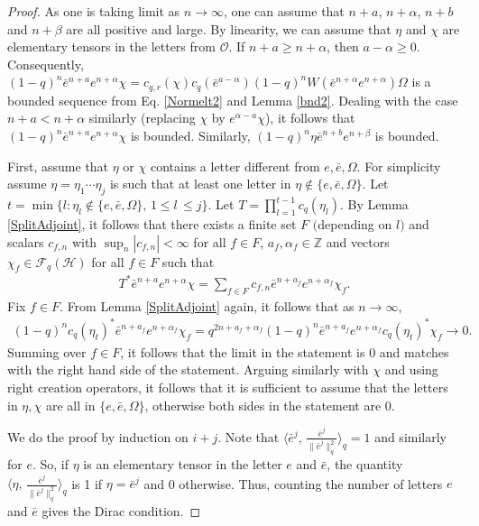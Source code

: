 \documentclass[12pt, a4paper,reqno]{amsart}
\theoremstyle{definition}
\renewcommand{\leq}{\leqslant}
\renewcommand{\geq}{\geqslant}
\newcommand{\CH}{\mathcal{H}}
\newcommand{\abs}[1]{\left\vert#1\right\vert}
\begin{document}
\begin{proof}
As one is taking limit as $n\rightarrow \infty$, one can assume that
$n+a$, $n+\alpha$, $n+b$ and $n+\beta$ are all positive and large. By
linearity, we can assume that $\eta$ and $\chi$ are elementary tensors
in the letters from $\mathcal{O}$. If $n+a\geq n+\alpha$, then
$a-\alpha\geq 0$. Consequently, $(1-q)^{n}
\bar{e}^{n+a}e^{n+\alpha}\chi = c_{q,r}(\chi) c_q(\bar
e^{a-\alpha})(1-q)^nW(\bar e^{n+\alpha} e^{n+\alpha})\Omega$ is a
bounded sequence from Eq. \eqref{Normelt2} and Lemma
\ref{bnd2}. Dealing with the case $n+a< n+\alpha$ similarly (replacing $\chi$ by $e^{\alpha-a}\chi$), it
follows that $(1-q)^{n}\bar{e}^{n+a}e^{n+\alpha}\chi$ is
bounded. Similarly, $(1-q)^{n}\eta\bar{e}^{n+b}e^{n+\beta}$ is
bounded.

First, assume that $\eta$ or $\chi$ contains a letter different from $e, \bar e, \Omega$. For simplicity assume $\eta=\eta_1\cdots\eta_j$  is such that at least one letter in $\eta \not\in \{e, \bar e, \Omega\}$. Let $t=\min\{l: \eta_l\not\in \{e,\bar e,\Omega\}, \, 1\leq l\,\leq j\}$. Let $T=\prod_{l=1}^{t-1} c_q(\eta_l)$. By Lemma \ref{SplitAdjoint}, it follows that there exists a finite set $F$ $($depending on $l)$ and scalars $c_{f,n}$ with $\sup_n\abs{c_{f,n}}<\infty$ for all $f\in F$, $a_f, \alpha_f\in \mathbb{Z}$ and vectors $\chi_f\in \mathcal{F}_q(\CH)$ for all $f\in F$ such that 
\begin{align*}
T^* \bar{e}^{n+a}e^{n+\alpha}\chi =\sum_{f\in F} c_{f,n} \bar{e}^{n+a_f}e^{n+\alpha_f}\chi_f.
\end{align*}
Fix $f\in F$. From Lemma \ref{SplitAdjoint} again, it follows that as $n\rightarrow\infty$, 
\begin{align*}
(1-q)^nc_q(\eta_t)^*\bar{e}^{n+a_f}e^{n+\alpha_f}\chi_f = q^{2n+a_f+\alpha_f} (1-q)^n\bar{e}^{n+a_f}e^{n+\alpha_f} c_q(\eta_t)^*\chi_f\rightarrow 0.
\end{align*}
Summing over $f\in F$, it follows that the limit in the statement is $0$ and matches with the right hand side of the statement.  Arguing similarly with $\chi$ and using right creation operators, it follows that it is sufficient to assume that the letters in $\eta,\chi$ are all in $\{e,\bar e, \Omega\}$, otherwise both sides in the statement are $0$.

We do the proof by induction on $i+j$. Note that $\langle \bar {e}^j,\,\frac{\bar{e}^j}{\|\bar{e}^j\|_q^2}\rangle_q=1$ and similarly for $e$. So, if $\eta$ is an elementary tensor in the letter $e$ and $\bar e$, the quantity $ \langle \eta,\,\frac{\bar{e}^j}{\|\bar{e}^j\|_q^2}\rangle_q$ is 1 if $\eta=\bar{e}^j$ and 0 otherwise. Thus, counting the number of letters $e$ and $\bar e$ gives the Dirac condition.


\end{proof}
\end{document}
